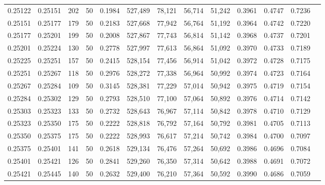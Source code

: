 \begin{tabular}{rrrrrrrrrrrrr}
0.25122 & 0.25151 &   202 &  50 &                                     0.1984 & 527,489 &  78,121 &  56,714 &  51,242 & 0.3961 & 0.4747 & 0.7236 \\
0.25151 & 0.25177 &   179 &  50 &                                     0.2183 & 527,668 &  77,942 &  56,764 &  51,192 & 0.3964 & 0.4742 & 0.7220 \\
0.25177 & 0.25201 &   199 &  50 &                                     0.2008 & 527,867 &  77,743 &  56,814 &  51,142 & 0.3968 & 0.4737 & 0.7201 \\
0.25201 & 0.25224 &   130 &  50 &                                     0.2778 & 527,997 &  77,613 &  56,864 &  51,092 & 0.3970 & 0.4733 & 0.7189 \\
0.25225 & 0.25251 &   157 &  50 &                                     0.2415 & 528,154 &  77,456 &  56,914 &  51,042 & 0.3972 & 0.4728 & 0.7175 \\
0.25251 & 0.25267 &   118 &  50 &                                     0.2976 & 528,272 &  77,338 &  56,964 &  50,992 & 0.3974 & 0.4723 & 0.7164 \\
0.25267 & 0.25284 &   109 &  50 &                                     0.3145 & 528,381 &  77,229 &  57,014 &  50,942 & 0.3975 & 0.4719 & 0.7154 \\
0.25284 & 0.25302 &   129 &  50 &                                     0.2793 & 528,510 &  77,100 &  57,064 &  50,892 & 0.3976 & 0.4714 & 0.7142 \\
0.25303 & 0.25323 &   133 &  50 &                                     0.2732 & 528,643 &  76,967 &  57,114 &  50,842 & 0.3978 & 0.4710 & 0.7129 \\
0.25323 & 0.25350 &   175 &  50 &                                     0.2222 & 528,818 &  76,792 &  57,164 &  50,792 & 0.3981 & 0.4705 & 0.7113 \\
0.25350 & 0.25375 &   175 &  50 &                                     0.2222 & 528,993 &  76,617 &  57,214 &  50,742 & 0.3984 & 0.4700 & 0.7097 \\
0.25375 & 0.25401 &   141 &  50 &                                     0.2618 & 529,134 &  76,476 &  57,264 &  50,692 & 0.3986 & 0.4696 & 0.7084 \\
0.25401 & 0.25421 &   126 &  50 &                                     0.2841 & 529,260 &  76,350 &  57,314 &  50,642 & 0.3988 & 0.4691 & 0.7072 \\
0.25421 & 0.25445 &   140 &  50 &                                     0.2632 & 529,400 &  76,210 &  57,364 &  50,592 & 0.3990 & 0.4686 & 0.7059 \\

\end{tabular}
